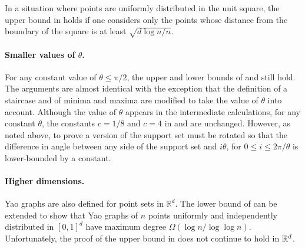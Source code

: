 \documentclass[lotsofwhite,charterfonts]{patmorin}
\newcommand{\RR}{\mathbb{R}}
\begin{document}
In a situation where points are uniformly distributed in the unit square,
the upper bound in  holds if one considers only
the points whose distance from the boundary of the square is at least
$\sqrt{d\log n/n}$.

\paragraph{Smaller values of $\theta$.}
For any constant value of $\theta \le \pi /2$, the upper and lower bounds
of  and 
still hold.  The arguments are almost identical with the exception that
the definition of a staircase and of minima and maxima are modified to
take the value of $\theta$ into account.  Although the value of $\theta$
appears in the intermediate calculations, for any constant $\theta$,
the constants $c=1/8$ and $c=4$ in 
and  are unchanged.  However, as noted above,
to prove a version of  the support set
must be rotated so that the difference in angle between any side of the
support set and $i\theta$, for $0\le i\le 2\pi/\theta$ is lower-bounded
by a constant.


\paragraph{Higher dimensions.}  
Yao graphs are also defined for point sets in $\RR^d$.  The lower bound
of  can be extended to show that Yao graphs of
$n$ points uniformly and independently distributed in $[0,1]^d$ have
maximum degree $\Omega(\log n/\log\log n)$. Unfortunately, the proof of
the upper bound in  does not continue to hold
in $\mathbb{R}^d$.




\nocite{*}

\end{document}
